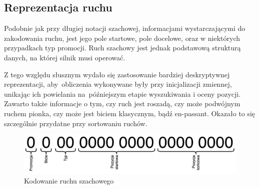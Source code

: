 \subsection{Reprezentacja ruchu}
\label{subsec:reprezentacja-ruchu}

Podobnie jak przy długiej notacji szachowej, informacjami wystarczającymi do zakodowania ruchu, jest jego pole startowe, pole docelowe, oraz w niektórych przypadkach typ promocji.
Ruch szachowy jest jednak podstawową strukturą danych, na której silnik musi operować.

Z tego względu słusznym wydało się zastosowanie bardziej deskryptywnej reprezentacji, aby~obliczenia wykonywane były przy inicjalizacji zmiennej, unikając ich powielania na~późniejszym etapie wyszukiwania i oceny pozycji.
Zawarto także informacje o tym, czy ruch jest roszadą, czy może podwójnym ruchem pionka, czy może jest biciem klasycznym, bądź en-passant.
Okazało to się szczególnie przydatne przy sortowaniu ruchów.

\begin{figure}[ht]
    \centering
    \includegraphics[width=1\linewidth]{rozdzialy/rozdzial01/2_reprezentacja-pozycji/rysunki/kodowanie-ruchu}
    \caption{Kodowanie ruchu szachowego}
    \label{fig:kodowanie-ruchu}
\end{figure}

